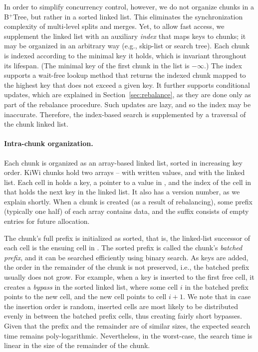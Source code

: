 In order to simplify concurrency control, however, we do not organize chunks in a B$^{+}$Tree, but rather in a sorted linked list. This eliminates the synchronization complexity of  multi-level splits and merges.  Yet, to allow fast access, we supplement the linked list with an auxiliary \emph{index} that maps keys to chunks; it may be organized in an arbitrary way (e.g., skip-list or search tree).
Each chunk is indexed according to the minimal key it holds, which is invariant throughout its lifespan. 
(The minimal key of the first chunk in the list is $-\infty$.)
The index supports a wait-free
lookup method that returns the indexed chunk mapped to  the highest key that does not exceed a given {key}. It further supports conditional updates, which are explained in Section~\ref{sec:rebalance}, as they are done only as part of the rebalance procedure. Such updates are lazy, and so
the index may be inaccurate. Therefore, the index-based search is supplemented by a traversal of the chunk linked list.



\paragraph{Intra-chunk organization.}
Each chunk is organized as an array-based linked list, sorted in increasing key order.
KiWi chunks hold two arrays --  with written values, and  with the linked list.
Each cell in  holds a key, a pointer 
to a value in , and the index of the cell in  that holds the next key in the linked list.
It also has a version number, as we explain shortly.
When a chunk is created (as a result of rebalancing), some prefix (typically one half) of each array contains data,
and the suffix consists of empty entries for future allocation.

The chunk's full prefix is initialized as sorted, that is, the linked-list successor of each cell is the ensuing cell in .
The sorted prefix is called the chunk's \emph{batched prefix}, and it can be searched efficiently using binary search.
As keys are added, the order in the remainder of the chunk is not preserved,
i.e., the batched prefix usually does not grow.
For example, when a key is inserted to the first free cell, it creates a \emph{bypass} in the sorted linked list, where some cell $i$ in the batched prefix
points to the new cell, and the new cell points to cell $i+1$.
We note that in case the insertion order is random, inserted cells are most likely to be distributed evenly in between the batched prefix cells, thus
creating fairly short bypasses.
Given that the prefix and the remainder are of similar sizes, the expected search time remains poly-logarithmic.
Nevertheless, in the worst-case, the search time is linear in the size of the remainder of the chunk.

